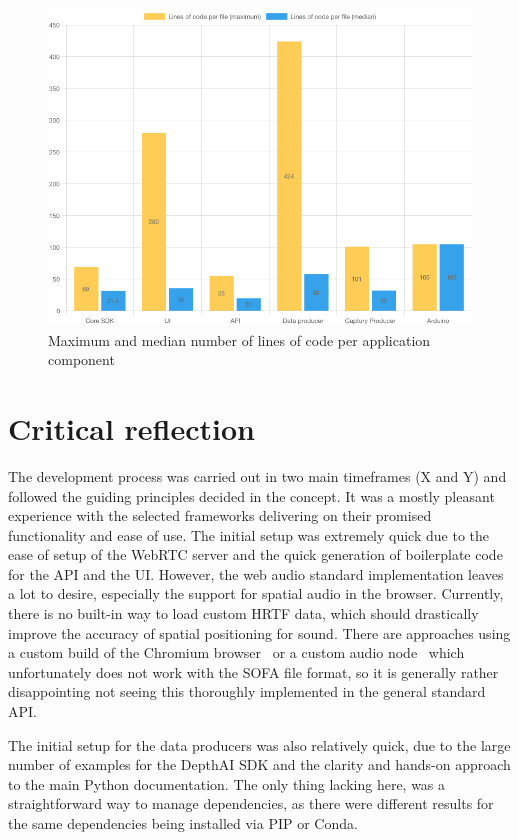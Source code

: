 \begin{figure}[h]
\centering
\includegraphics[scale=0.5]{04_Artefakte/01_Abbildungen/code-stats-loc}
\caption[Lines of code]{Maximum and median number of lines of code per application component\protect}
\label{fig:linesOfCode}
\end{figure}

\section{Critical reflection}
\label{sec:critical-reflection}

The development process was carried out in two main timeframes (X and Y) and followed the guiding principles decided in the concept.
It was a mostly pleasant experience with the selected frameworks delivering on their promised functionality and ease of use.
The initial setup was extremely quick due to the ease of setup of the WebRTC server and the quick generation of boilerplate code for the \ac{API} and the \ac{UI}.
However, the web audio standard implementation leaves a lot to desire, especially the support for spatial audio in the browser.
Currently, there is no built-in way to load custom \ac{HRTF} data, which should drastically improve the accuracy of spatial positioning for sound.
There are approaches using a custom build of the Chromium browser~\parencite{chromiumCustomHrtf} or a custom audio node~\parencite{customHrtfAudioNode} which unfortunately does not work with the \ac{SOFA} file format, so it is generally rather disappointing not seeing this thoroughly implemented in the general standard \ac{API}.

The initial setup for the data producers was also relatively quick, due to the large number of examples for the DepthAI \ac{SDK} and the clarity and hands-on approach to the main Python documentation.
The only thing lacking here, was a straightforward way to manage dependencies, as there were different results for the same dependencies being installed via PIP or Conda.

